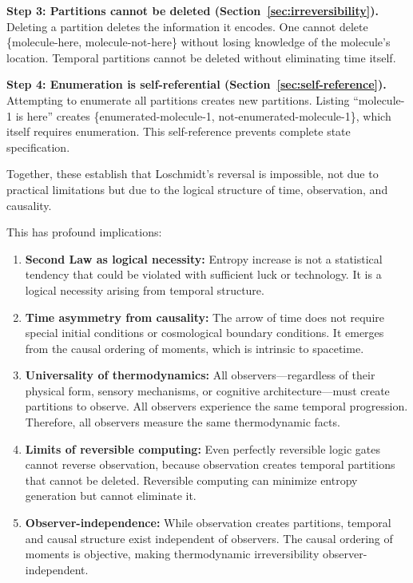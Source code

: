 \documentclass[twocolumn,10pt]{article}
\theoremstyle{definition}
\theoremstyle{remark}
\begin{document}
\vspace{0.2cm}
\noindent\textbf{Step 3: Partitions cannot be deleted (Section~\ref{sec:irreversibility}).} Deleting a partition deletes the information it encodes. One cannot delete \{molecule-here, molecule-not-here\} without losing knowledge of the molecule's location. Temporal partitions cannot be deleted without eliminating time itself.

\vspace{0.2cm}
\noindent\textbf{Step 4: Enumeration is self-referential (Section~\ref{sec:self-reference}).} Attempting to enumerate all partitions creates new partitions. Listing ``molecule-1 is here'' creates \{enumerated-molecule-1, not-enumerated-molecule-1\}, which itself requires enumeration. This self-reference prevents complete state specification.

\vspace{0.2cm}
\noindent Together, these establish that Loschmidt's reversal is impossible, not due to practical limitations but due to the logical structure of time, observation, and causality.

\vspace{0.2cm}
\noindent This has profound implications:

\begin{enumerate}
\item \textbf{Second Law as logical necessity:} Entropy increase is not a statistical tendency that could be violated with sufficient luck or technology. It is a logical necessity arising from temporal structure.

\item \textbf{Time asymmetry from causality:} The arrow of time does not require special initial conditions\cite{penrose1989} or cosmological boundary conditions\cite{hawking1985}. It emerges from the causal ordering of moments, which is intrinsic to spacetime.

\item \textbf{Universality of thermodynamics:} All observers—regardless of their physical form, sensory mechanisms, or cognitive architecture—must create partitions to observe. All observers experience the same temporal progression. Therefore, all observers measure the same thermodynamic facts.

\item \textbf{Limits of reversible computing:} Even perfectly reversible logic gates\cite{bennett1973} cannot reverse observation, because observation creates temporal partitions that cannot be deleted. Reversible computing can minimize entropy generation but cannot eliminate it.

\item \textbf{Observer-independence:} While observation creates partitions, temporal and causal structure exist independent of observers. The causal ordering of moments is objective, making thermodynamic irreversibility observer-independent.
\end{enumerate}
\end{document}

